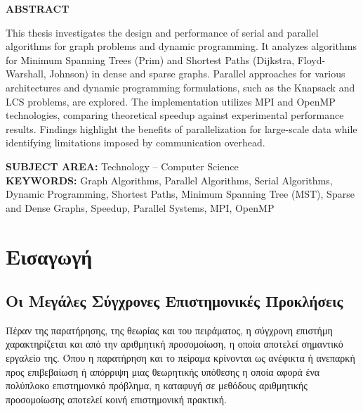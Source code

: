\documentclass[12pt,a4paper]{article} %
\begin{document}
\begin{center}
    \vspace*{1.5cm}
    \textbf{\large ABSTRACT}\\[1.0cm]
\end{center}

This thesis investigates the design and per\-for\-mance of serial and par\-al\-lel algorithms for graph problems and dynamic pro\-gram\-ming. It analyzes algorithms for Minimum Spanning Trees (Prim) and Shortest Paths (Dijk\-stra, Floyd-Warshall, Johnson) in dense and sparse graphs. Par\-al\-lel approaches for various ar\-chi\-tec\-tures and dynamic pro\-gram\-ming for\-mu\-la\-tions, such as the Knapsack and LCS problems, are explored. The im\-ple\-men\-ta\-tion utilizes MPI and OpenMP tech\-nol\-o\-gies, comparing the\-o\-ret\-i\-cal speedup against ex\-per\-i\-men\-tal per\-for\-mance results. Findings highlight the benefits of par\-al\-lel\-iza\-tion for large-scale data while identifying lim\-i\-ta\-tions imposed by com\-mu\-ni\-ca\-tion over\-head.

\vfill %

\noindent \textbf{SUBJECT AREA:} Technology – Computer Science\\[0.4cm]
\noindent \textbf{KEYWORDS:} Graph Algorithms, Parallel Algorithms, Serial Algorithms, Dynamic Pro\-gram\-ming, Shortest Paths, Minimum Spanning Tree (MST), Sparse and Dense Graphs, Speedup, Parallel Systems, MPI, OpenMP

\clearpage
\pagestyle{empty} %

\tableofcontents
\clearpage

\pagestyle{fancy} %
\setcounter{page}{1} %
\nocite{*}
\section{Εισαγωγή}
\subsection{Οι Μεγάλες Σύγχρονες Επιστημονικές Προκλήσεις}

Πέραν της παρατήρησης, της θεωρίας και του πειράματος, η σύγχρονη 
επιστήμη χαρακτηρίζεται και από την αριθμητική προσομοίωση, η οποία 
αποτελεί σημαντικό εργαλείο της. Όπου η παρατήρηση και το πείραμα 
κρίνονται ως ανέφικτα ή ανεπαρκή προς επιβεβαίωση ή απόρριψη μιας 
θεωρητικής υπόθεσης η οποία αφορά ένα πολύπλοκο επιστημονικό πρόβλημα, 
η καταφυγή σε μεθόδους αριθμητικής προσομοίωσης αποτελεί κοινή 
επιστημονική πρακτική.
\end{document}

